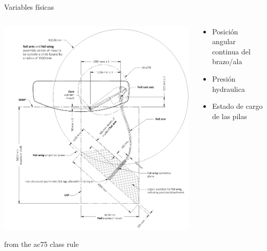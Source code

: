 \documentclass[presentation,aspectratio=169]{beamer}
\begin{document}
\begin{frame}[label={sec:orgb9d857c}]{Variables físicas}
\begin{columns}
\begin{column}{0.5\columnwidth}
\begin{center}
\includegraphics[height=0.8\textheight]{../../figures/ac75-class-foil.png}
\end{center}

{\footnotesize from the ac75 class rule}
\end{column}
\begin{column}{0.5\columnwidth}
\begin{itemize}
\item Posición angular continua del brazo/ala
\item Presión hydraulica
\item Estado de cargo de las pilas
\end{itemize}
\end{column}
\end{columns}
\end{frame}
\end{document}
